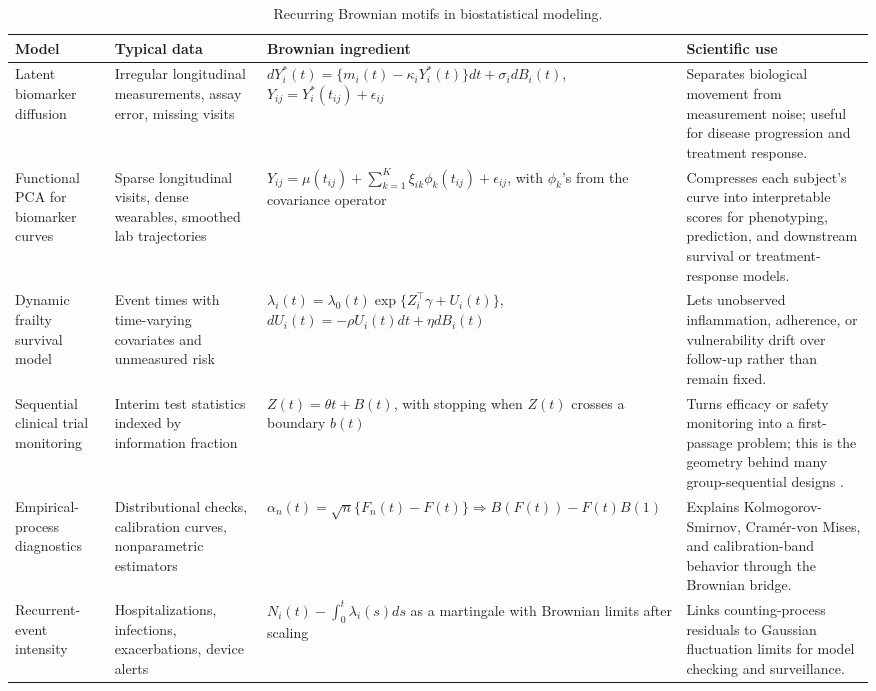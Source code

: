\documentclass{article}
\theoremstyle{plain}
\theoremstyle{definition}
\begin{document}
\begin{table}[H]
\centering
\small
\caption{Recurring Brownian motifs in biostatistical modeling.}
\label{tab:biostats-field-guide}
\begin{tabularx}{\textwidth}{>{\RaggedRight\arraybackslash}p{}>{\RaggedRight\arraybackslash}p{}>{\RaggedRight\arraybackslash}p{}>{\RaggedRight\arraybackslash}X}
\toprule
Model & Typical data & Brownian ingredient & Scientific use \\
\midrule
Latent biomarker diffusion & Irregular longitudinal measurements, assay error, missing visits & 
\(dY_i^\ast(t)=\{m_i(t)-\kappa_iY_i^\ast(t)\}dt+\sigma_i dB_i(t)\), \(Y_{ij}=Y_i^\ast(t_{ij})+\epsilon_{ij}\) &
Separates biological movement from measurement noise; useful for disease progression and treatment response. \\
Functional PCA for biomarker curves & Sparse longitudinal visits, dense wearables, smoothed lab trajectories &
\(Y_{ij}=\mu(t_{ij})+\sum_{k=1}^{K}\xi_{ik}\phi_k(t_{ij})+\epsilon_{ij}\), with \(\phi_k\)'s from the covariance operator &
Compresses each subject's curve into interpretable scores for phenotyping, prediction, and downstream survival or treatment-response models. \\
Dynamic frailty survival model & Event times with time-varying covariates and unmeasured risk &
\(\lambda_i(t)=\lambda_0(t)\exp\{Z_i^\top\gamma+U_i(t)\}\), \(dU_i(t)=-\rho U_i(t)dt+\eta dB_i(t)\) &
Lets unobserved inflammation, adherence, or vulnerability drift over follow-up rather than remain fixed. \\
Sequential clinical trial monitoring & Interim test statistics indexed by information fraction &
\(Z(t)=\theta t+B(t)\), with stopping when \(Z(t)\) crosses a boundary \(b(t)\) &
Turns efficacy or safety monitoring into a first-passage problem; this is the geometry behind many group-sequential designs \citep{lan1983discrete}. \\
Empirical-process diagnostics & Distributional checks, calibration curves, nonparametric estimators &
\(\alpha_n(t)=\sqrt n\{F_n(t)-F(t)\}\Rightarrow B(F(t))-F(t)B(1)\) &
Explains Kolmogorov-Smirnov, Cramér-von Mises, and calibration-band behavior through the Brownian bridge. \\
Recurrent-event intensity & Hospitalizations, infections, exacerbations, device alerts &
\(N_i(t)-\int_0^t\lambda_i(s)ds\) as a martingale with Brownian limits after scaling &
Links counting-process residuals to Gaussian fluctuation limits for model checking and surveillance. \\

\end{tabularx}
\end{table}
\end{document}
